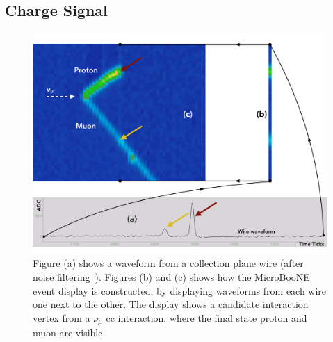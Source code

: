 \subsection{Charge Signal}
\label{sec:signal_formation}

\begin{figure}[t]
\centering
\includegraphics[width=.80\textwidth]{images/MicroBooNE/evd_from_wf}
\caption[MicroBooNE Event Display from Raw Waveform]{Figure (a) shows a waveform from a collection plane wire (after noise filtering~\cite{noise_paper}). Figures (b) and (c) shows how the MicroBooNE event display is constructed, by displaying waveforms from each wire one next to the other. The display shows a candidate interaction vertex from a $\nu_\mu$ \acrshort{cc} interaction, where the final state proton and muon are visible.}
\label{fig:evd_from_wf}
\end{figure}

